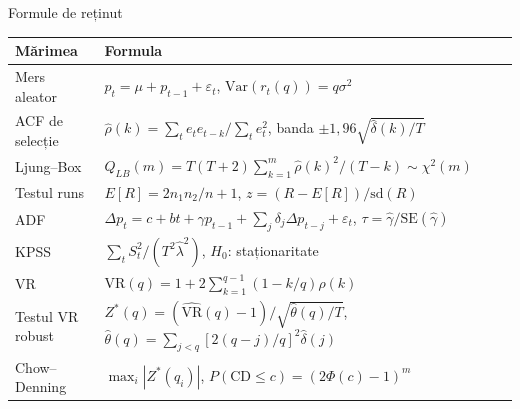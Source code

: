 \begin{frame}{Formule de reținut}
\itemsize{\small}
{\renewcommand{\arraystretch}{1.45}\begin{center}
\footnotesize
\begin{tabular}{ll}
\toprule
\textbf{Mărimea} & \textbf{Formula} \\
\midrule
Mers aleator & $p_t = \mu + p_{t-1} + \varepsilon_t$, \quad $\mathrm{Var}(r_t(q)) = q\sigma^2$ \\
ACF de selecție & $\hat\rho(k) = \sum_t e_te_{t-k}/\sum_t e_t^2$, \quad banda $\pm 1{,}96\sqrt{\hat\delta(k)/T}$ \\
Ljung--Box & $Q_{LB}(m) = T(T+2)\sum_{k=1}^m \hat\rho(k)^2/(T-k) \sim \chi^2(m)$ \\
Testul runs & $E[R] = 2n_1n_2/n + 1$, \quad $z = (R - E[R])/\mathrm{sd}(R)$ \\
ADF & $\Delta p_t = c + bt + \gamma p_{t-1} + \sum_j \delta_j\Delta p_{t-j} + \varepsilon_t$, \quad $\tau = \hat\gamma/\mathrm{SE}(\hat\gamma)$ \\
KPSS & $\sum_t S_t^2/(T^2\hat\lambda^2)$, \quad $H_0$: staționaritate \\
VR & $\mathrm{VR}(q) = 1 + 2\sum_{k=1}^{q-1}(1 - k/q)\rho(k)$ \\
Testul VR robust & $Z^*(q) = (\widehat{\mathrm{VR}}(q) - 1)/\sqrt{\hat\theta(q)/T}$, \quad $\hat\theta(q) = \sum_{j<q}[2(q-j)/q]^2\hat\delta(j)$ \\
Chow--Denning & $\max_i |Z^*(q_i)|$, \quad $P(\mathrm{CD} \le c) = (2\Phi(c) - 1)^m$ \\
\bottomrule
\end{tabular}
\end{center}
}
\end{frame}


